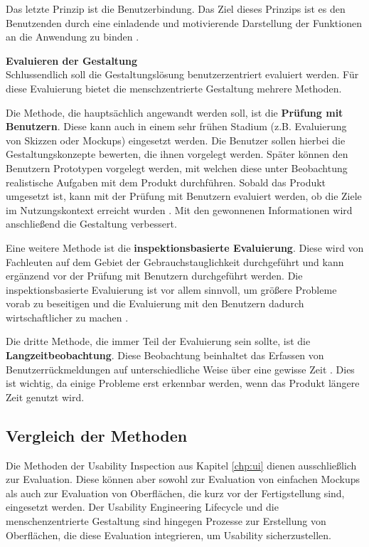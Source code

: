 \documentclass[utf8,biblatex]{lni}
\begin{document}
Das letzte Prinzip ist die Benutzerbindung. Das Ziel dieses Prinzips ist es den Benutzenden durch eine einladende und motivierende Darstellung der Funktionen an die Anwendung zu binden \cite[vgl.][11]{DINDeutschesInstitutfurNormunge.V..f}.

\textbf{Evaluieren der Gestaltung}\\
Schlussendlich soll die Gestaltungslösung benutzerzentriert evaluiert werden. Für diese Evaluierung bietet die menschzentrierte Gestaltung mehrere Methoden.

Die Methode, die hauptsächlich angewandt werden soll, ist die \textbf{Prüfung mit Benutzern}. Diese kann auch in einem sehr frühen Stadium (z.B. Evaluierung von Skizzen oder Mockups) eingesetzt werden. Die Benutzer sollen hierbei die Gestaltungskonzepte bewerten, die ihnen vorgelegt werden. Später können den Benutzern Prototypen vorgelegt werden, mit welchen diese unter Beobachtung realistische Aufgaben mit dem Produkt durchführen. Sobald das Produkt umgesetzt ist, kann mit der Prüfung mit Benutzern evaluiert werden, ob die Ziele im Nutzungskontext erreicht wurden \cite[29]{DINDeutschesInstitutfurNormunge.V..f}. Mit den gewonnenen Informationen wird anschließend die Gestaltung verbessert.

Eine weitere Methode ist die \textbf{inspektionsbasierte Evaluierung}. Diese wird von Fachleuten auf dem Gebiet der Gebrauchstauglichkeit durchgeführt und kann ergänzend vor der Prüfung mit Benutzern durchgeführt werden. Die inspektionsbasierte Evaluierung ist vor allem sinnvoll, um größere Probleme vorab zu beseitigen und die Evaluierung mit den Benutzern dadurch wirtschaftlicher zu machen \cite[29]{DINDeutschesInstitutfurNormunge.V..f}.

Die dritte Methode, die immer Teil der Evaluierung sein sollte, ist die \textbf{Langzeitbeobachtung}. Diese Beobachtung beinhaltet das Erfassen von Benutzerrückmeldungen auf unterschiedliche Weise über eine gewisse Zeit \cite[30]{DINDeutschesInstitutfurNormunge.V..f}. Dies ist wichtig, da einige Probleme erst erkennbar werden, wenn das Produkt längere Zeit genutzt wird.


\subsection{Vergleich der Methoden}
Die Methoden der Usability Inspection aus Kapitel \ref{chp:ui} dienen ausschließlich zur Evaluation. Diese können aber sowohl zur Evaluation von einfachen Mockups als auch zur Evaluation von Oberflächen, die kurz vor der Fertigstellung sind, eingesetzt werden. Der Usability Engineering Lifecycle und die menschenzentrierte Gestaltung sind hingegen Prozesse zur Erstellung von Oberflächen, die diese Evaluation integrieren, um Usability sicherzustellen.
\end{document}
